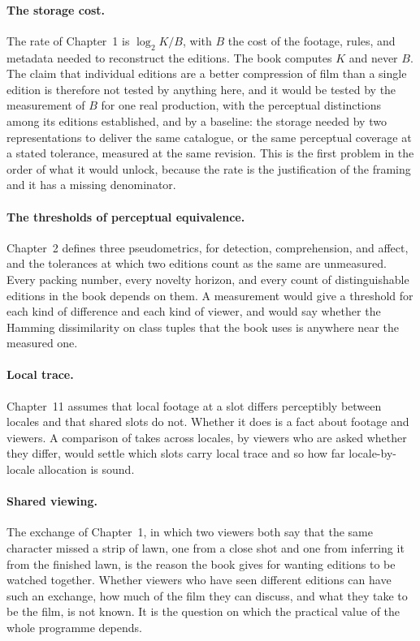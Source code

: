 \documentclass[11pt,twoside,openright]{book}
\theoremstyle{plain}
\theoremstyle{definition}
\theoremstyle{remark}
\begin{document}
\paragraph{The storage cost.} The rate of Chapter~1 is $\log_2K/B$, with $B$ the cost of the footage, rules, and metadata needed to reconstruct the editions. The book computes $K$ and never $B$. The claim that individual editions are a better compression of film than a single edition is therefore not tested by anything here, and it would be tested by the measurement of $B$ for one real production, with the perceptual distinctions among its editions established, and by a baseline: the storage needed by two representations to deliver the same catalogue, or the same perceptual coverage at a stated tolerance, measured at the same revision. This is the first problem in the order of what it would unlock, because the rate is the justification of the framing and it has a missing denominator.

\paragraph{The thresholds of perceptual equivalence.} Chapter~2 defines three pseudometrics, for detection, comprehension, and affect, and the tolerances at which two editions count as the same are unmeasured. Every packing number, every novelty horizon, and every count of distinguishable editions in the book depends on them. A measurement would give a threshold for each kind of difference and each kind of viewer, and would say whether the Hamming dissimilarity on class tuples that the book uses is anywhere near the measured one.

\paragraph{Local trace.} Chapter~11 assumes that local footage at a slot differs perceptibly between locales and that shared slots do not. Whether it does is a fact about footage and viewers. A comparison of takes across locales, by viewers who are asked whether they differ, would settle which slots carry local trace and so how far locale-by-locale allocation is sound.

\paragraph{Shared viewing.} The exchange of Chapter~1, in which two viewers both say that the same character missed a strip of lawn, one from a close shot and one from inferring it from the finished lawn, is the reason the book gives for wanting editions to be watched together. Whether viewers who have seen different editions can have such an exchange, how much of the film they can discuss, and what they take to be the film, is not known. It is the question on which the practical value of the whole programme depends.
\end{document}
